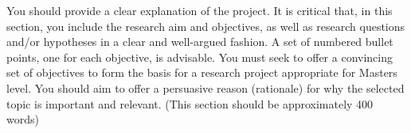 
You should provide a clear explanation of the project. It is critical that, in this section, you include the research aim and objectives, as well as research questions and/or hypotheses in a clear and well-argued fashion. A set of numbered bullet points, one for each objective, is advisable. You must seek to offer a convincing set of objectives to form the basis for a research project appropriate for Masters level. You should aim to offer a persuasive reason (rationale) for why the selected topic is important and relevant.
(This section should be approximately 400 words)
